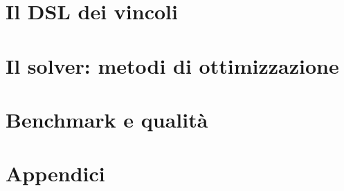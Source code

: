 \part{Il DSL dei vincoli}
\label{part:dsl}



\part{Il solver: metodi di ottimizzazione}
\label{part:solver}











\part{Benchmark e qualit\`a}
\label{part:benchmark}




\appendix
\part{Appendici}
\label{part:appendici}








\backmatter

\printbibliography[heading=bibintoc, title={Bibliografia}]

\printindex


